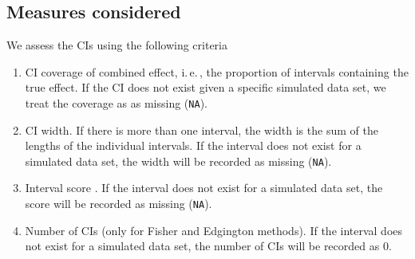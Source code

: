 \documentclass[letterpaper, 12pt]{article}
\newcommand{\ie}{{i.\,e.\,}}
\begin{document}

\subsection{Measures considered} \label{sec:meas}

We assess the CIs using the following criteria
\begin{enumerate}
  \item CI coverage of combined effect, \ie, the proportion of intervals
    containing the true effect. If the CI does not exist given a specific
    simulated data set, we treat the coverage as as missing (\texttt{NA}).
  \item CI width. If there is more than one interval, the width is the sum of
    the lengths of the individual intervals. If the interval does not exist for
    a simulated data set, the width will be recorded as missing (\texttt{NA}).
  \item Interval score \citep{Gnei:Raft:07}. If the interval does not exist for
    a simulated data set, the score will be recorded as missing (\texttt{NA}).
  \item Number of CIs (only for Fisher and Edgington methods). If the interval
  does not exist for a simulated data set, the number of CIs will be recorded as
  0. %
\end{enumerate}
\end{document}
